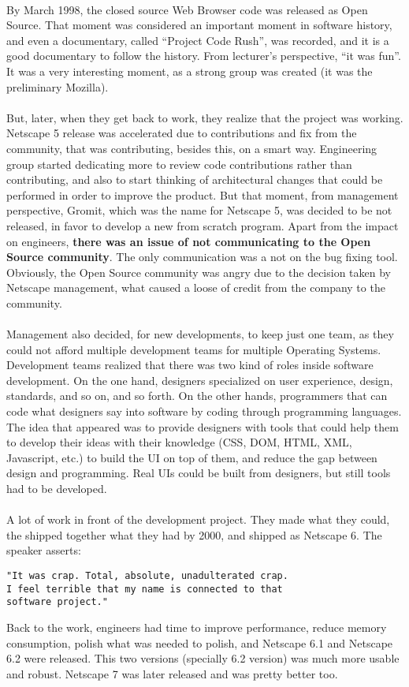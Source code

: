 \documentclass[11pt]{article}
\begin{document}
\\
By March 1998, the closed source Web Browser code was released as Open Source. That moment was considered an important moment in software history, and even a documentary, called ``Project Code Rush'', was recorded, and it is a good documentary to follow the history. From lecturer's perspective, ``it was fun''. It was a very interesting moment, as a strong group was created (it was the preliminary Mozilla).\\
\\
But, later, when they get back to work, they realize that the project was working. Netscape 5 release was accelerated due to contributions and fix from the community, that was contributing, besides this, on a smart way. Engineering group started dedicating more to review code contributions rather than contributing, and also to start thinking of architectural changes that could be performed in order to improve the product. But that moment, from management perspective, Gromit, which was the name for Netscape 5, was decided to be not released, in favor to develop a new from scratch program. Apart from the impact on engineers, \textbf{there was an issue of not communicating to the Open Source community}. The only communication was a not on the bug fixing tool. Obviously, the Open Source community was angry due to the decision taken by Netscape management, what caused a loose of credit from the company to the community.\\
\\
Management also decided, for new developments, to keep just one team, as they could not afford multiple development teams for multiple Operating Systems. Development teams realized that there was two kind of roles inside software development. On the one hand, designers specialized on user experience, design, standards, and so on, and so forth. On the other hands, programmers that can code what designers say into software by coding through programming languages. The idea that appeared was to provide designers with tools that could help them to develop their ideas with their knowledge (CSS, DOM, HTML, XML, Javascript, etc.) to build the UI on top of them, and reduce the gap between design and programming. Real UIs could be built from designers, but still tools had to be developed.\\
\\
A lot of work in front of the development project. They made what they could, the shipped together what they had by 2000, and shipped as Netscape 6. The speaker asserts:
\begin{verbatim}
"It was crap. Total, absolute, unadulterated crap.
I feel terrible that my name is connected to that
software project."
\end{verbatim}
Back to the work, engineers had time to improve performance, reduce memory consumption, polish what was needed to polish, and Netscape 6.1 and Netscape 6.2 were released. This two versions (specially 6.2 version) was much more usable and robust. Netscape 7 was later released and was pretty better too.
\end{document}
